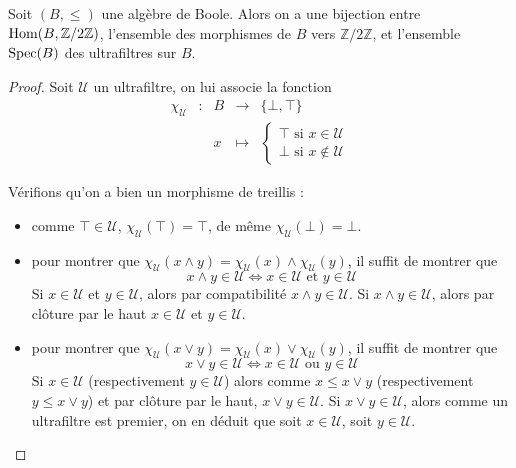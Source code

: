 \begin{proposition}
  Soit $(B,\leq)$ une algèbre de Boole. Alors on a une bijection entre
  $\operatorname{Hom}(B,\mathbb Z/2\mathbb Z)$, l'ensemble des morphismes de $B$ vers
  $\mathbb Z/2\mathbb Z$, et l'ensemble $\operatorname{Spec}(B)$ des ultrafiltres sur $B$.
\end{proposition}

\begin{proof}
  Soit $\mathcal U$ un ultrafiltre, on lui associe la fonction
  \[\begin{array}{ccccc}
  \chi_{\mathcal U} & : & B & \longrightarrow & \{\bot,\top\}\\
  & & x &\longmapsto& \begin{cases}
    \top\text{ si } x\in \mathcal U\\
    \bot\text{ si } x\notin\mathcal U
  \end{cases}
  \end{array}\]

  Vérifions qu'on a bien un morphisme de treillis :
  \begin{itemize}
  \item comme $\top\in\mathcal U$, $\chi_\mathcal U(\top) = \top$, de même
    $\chi_\mathcal U(\bot) = \bot$.
  \item pour montrer que
    $\chi_\mathcal U(x\land y) = \chi_\mathcal U(x)\land\chi_\mathcal U(y)$, il
    suffit de montrer que
    \[x\land y \in \mathcal U \iff x\in\mathcal U \text{ et }y\in\mathcal U\]
    Si $x\in \mathcal U$ et $y\in\mathcal U$, alors par compatibilité
    $x\land y \in \mathcal U$. Si $x\land y \in \mathcal U$, alors par clôture
    par le haut $x\in \mathcal U$ et $y\in \mathcal U$.
  \item pour montrer que
    $\chi_\mathcal U(x\lor y) = \chi_\mathcal U(x)\lor\chi_\mathcal U(y)$, il
    suffit de montrer que
    \[x\lor y \in \mathcal U \iff x\in\mathcal U \text{ ou }y\in\mathcal U\]
    Si $x\in \mathcal U$ (respectivement $y\in \mathcal U$) alors comme
    $x\leq x\lor y$ (respectivement $y\leq x\lor y$) et par clôture par le haut,
    $x\lor y \in \mathcal U$. Si $x\lor y \in \mathcal U$, alors comme un
    ultrafiltre est premier, on en déduit que soit $x\in\mathcal U$, soit
    $y\in \mathcal U$.
  \end{itemize}


\end{proof}
